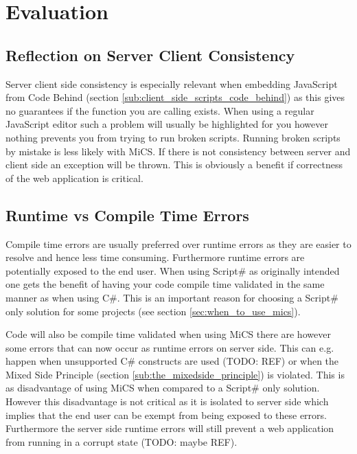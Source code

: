 \chapter{Evaluation}







\section{Reflection on Server Client Consistency} %
\label{sec:reflection_on_server_client_consistency}
	Server client side consistency is especially relevant when embedding JavaScript from Code Behind (section \ref{sub:client_side_scripts_code_behind}) as this gives no guarantees if the function you are calling exists. When using a regular JavaScript editor such a problem will usually be highlighted for you however nothing prevents you from trying to run broken scripts. Running broken scripts by mistake is less likely with MiCS. If there is not consistency between server and client side an exception will be thrown. This is obviously a benefit if correctness of the web application is critical.

\section{Runtime vs Compile Time Errors} %
\label{sec:runtime_vs_compile_time_errors}
	Compile time errors are usually preferred over runtime errors as they are easier to resolve and hence less time consuming. Furthermore runtime errors are potentially exposed to the end user.  When using Script\# as originally intended one gets the benefit of having your code compile time validated in the same manner as when using C\#. This is an important reason for choosing a Script\# only solution for some projects (see section \ref{sec:when_to_use_mics}).

	Code will also be compile time validated when using MiCS there are however some errors that can now occur as runtime errors on server side. This can e.g. happen when unsupported C\# constructs are used (TODO: REF) or when the Mixed Side Principle (section \ref{sub:the_mixedside_principle}) is violated. This is as disadvantage of using MiCS when compared to a Script\# only solution. However this disadvantage is not critical as it is isolated to server side which implies that the end user can be exempt from being exposed to these errors. Furthermore the server side runtime errors will still prevent a web application from running in a corrupt state (TODO: maybe REF). 


